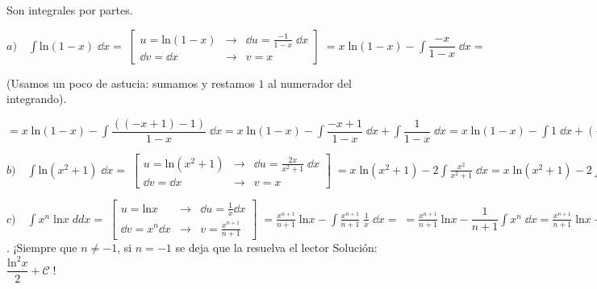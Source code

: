 \begin{proofw}\renewcommand{\qedsymbol}{$\diamond$}	

Son integrales por partes.

$a) \quad  \displaystyle \int \mathrm{ln}(1-x) \; \dd x = \;  \left[ \begin{matrix} u=\mathrm{ln}(1-x) & \to & \dd u= \frac {-1}{1-x}\; \dd x \\ \dd v = \dd x & \to & v=x \end{matrix} \right] \; = x\; \mathrm{ln}(1-x) - \int \dfrac {-x}{1-x}\; \dd x =$

\small{(Usamos un poco de astucia: sumamos y restamos $1$ al numerador del integrando)}\normalsize{.}

$= \displaystyle  x\; \mathrm{ln}(1-x) - \int \dfrac {\left((-x+1)-1\right)}{1-x}\; \dd x = x\; \mathrm{ln}(1-x) - \int \dfrac {-x+1}{1-x}\; \dd x + \int \dfrac 1 {1-x} \; \dd x=x\; \mathrm{ln}(1-x) - \int 1\; \dd x + (-1) \int \dfrac {-1}{1-x} \dd x = x \mathrm{ln}(1-x)-x-\mathrm{ln}(1-x)+ \mathcal C = (x-1)\mathrm{ln}(1-x) - x + \mathcal C $


$b) \quad   \displaystyle \int \mathrm{ln}(x^2+1) \; \dd x =\; \left[ \begin{matrix} u=\mathrm{ln}(x^2+1) & \to & \dd u = \frac {2x}{x^2+1} \; \dd x \\
    \dd v = \dd x   & \to & v = x \end{matrix} \right] \; = x \; \mathrm{ln}(x^2+1) - 2\int \frac { x^2}{x^2+1}\; \dd x= x \; \mathrm{ln}(x^2+1) - 2\int \frac { x^2+1-1}{x^2+1}\; \dd x= x \; \mathrm{ln}(x^2+1) - 2 \left( \int 1\; \dd x - \int \frac { -1}{x^2+1}\; \dd x  \right) =x \; \mathrm{ln}(x^2+1) -2x +2 \arctan x +\mathcal C$ 


$c) \quad \displaystyle \int  x^n\; \mathrm{ln}x \; dd x = \;\left[ \begin{matrix}  u=\mathrm{ln}x & \to & \dd u = \frac 1 x \dd x \\ \dd v = x^n \dd x & \to & v= \frac {x^{n+1}}{n+1} \end{matrix} \right]\; =\frac {x^{n+1}}{n+1} \; \mathrm{ln}x - \int \frac {x^{n+1}}{n+1} \; \frac 1 x \; \dd x =\; =\frac {x^{n+1}}{n+1} \; \mathrm{ln}x - \dfrac {1}{n+1} \int   x^n\; \dd x = \frac {x^{n+1}}{n+1} \; \mathrm{ln}x - \dfrac {x^{n+1}}{(n+1)^2}+\mathcal C\; \; $ . ¡Siempre que $n \neq -1$, si $n=-1$ se deja que la resuelva el lector \textcolor{gris}{Solución: $\dfrac {\mathrm{ln}^2 x}{2}+\mathcal C\; $}!



\end{proofw}
